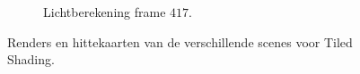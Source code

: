 \begin{figure}[t]
\begin{subfigure}[b]{0.35\textwidth}
    \caption{Lichtberekening frame $417$.}
    \label{fig:cs-test-frames-example:zc417cs}
  \end{subfigure}
  \caption{ Renders en hittekaarten van de verschillende scenes voor Tiled Shading.}
  \label{fig:cs-test-frames-example:zc}
\end{figure}

